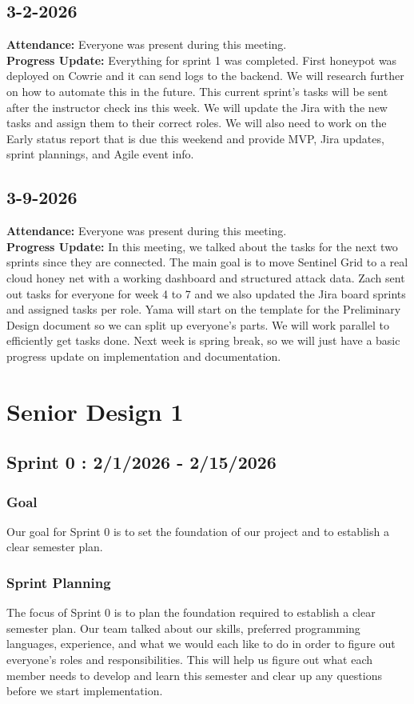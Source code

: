 \documentclass{article}
\begin{document}
\subsection{3-2-2026}
\textbf{Attendance:} Everyone was present during this meeting. 
\\\textbf{Progress Update:} Everything for sprint 1 was completed. First honeypot was deployed on Cowrie and it can send logs to the backend. We will research further on how to automate this in the future. This current sprint's tasks will be sent after the instructor check ins this week. We will update the Jira with the new tasks and assign them to their correct roles. We will also need to work on the Early status report that is due this weekend and provide MVP, Jira updates, sprint plannings, and Agile event info.

\subsection{3-9-2026}
\textbf{Attendance:} Everyone was present during this meeting. 
\\\textbf{Progress Update:} In this meeting, we talked about the tasks for the next two sprints since they are connected. The main goal is to move Sentinel Grid to a real cloud honey net with a working dashboard and structured attack data. Zach sent out tasks for everyone for week 4 to 7 and we also updated the Jira board sprints and assigned tasks per role. Yama will start on the template for the Preliminary Design document so we can split up everyone's parts. We will work parallel to efficiently get tasks done. Next week is spring break, so we will just have a basic progress update on implementation and documentation. 


\section{Senior Design 1}
\subsection{Sprint 0 : 2/1/2026 - 2/15/2026}
\subsubsection{Goal}
Our goal for Sprint 0 is to set the foundation of our project and to establish a clear semester plan.
\subsubsection{Sprint Planning}
The focus of Sprint 0 is to plan the foundation required to establish a clear semester plan. Our team talked about our skills, preferred programming languages, experience, and what we would each like to do in order to figure out everyone's roles and responsibilities. This will help us figure out what each member needs to develop and learn this semester and clear up any questions before we start implementation. 
\end{document}
